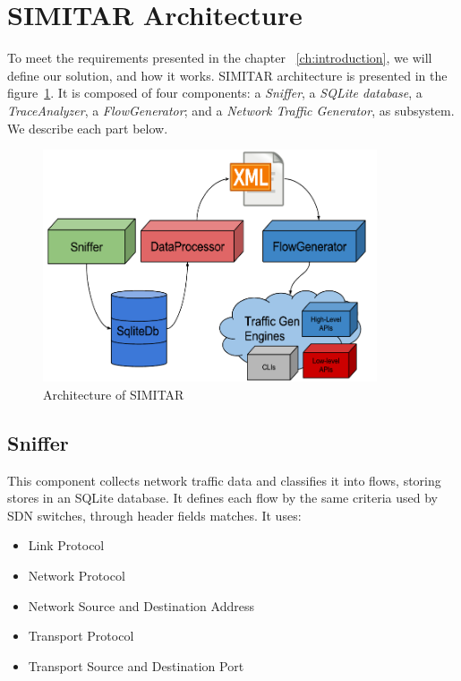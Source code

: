 \section{SIMITAR Architecture}


To meet the requirements presented in the chapter ~\ref{ch:introduction}, we will define our solution, and how it works. SIMITAR architecture is presented in the figure~\ref{fig:architecture}. It is composed of four components: a \textit{Sniffer}, a \textit{SQLite database}, a \textit{TraceAnalyzer}, a \textit{FlowGenerator};  and a \textit{Network Traffic Generator}, as subsystem. We describe each part below.

\begin{figure}[ht!]
        \centering
        \includegraphics[height=2.7in]{figures/ch3/architecture-diagram}
        \caption{Architecture of SIMITAR}
    \label{fig:architecture}
\end{figure}


\subsection{Sniffer}


This component collects network traffic data and classifies it into flows, storing stores in an SQLite database. It defines each flow by the same criteria used by SDN switches\cite{sdn-survey},  through header fields matches. It uses:

\begin{itemize}
\item Link Protocol
\item Network Protocol
\item Network Source and Destination Address
\item Transport Protocol
\item Transport Source and Destination Port
\end{itemize}

